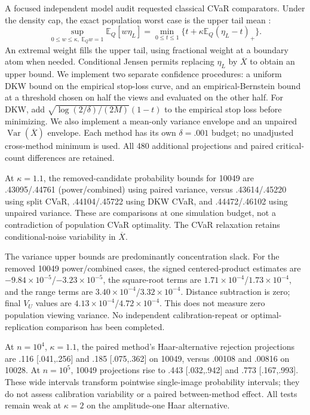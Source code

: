 A focused independent model audit requested classical CVaR comparators. Under
the density cap, the exact population worst case is the upper tail mean
\citep{rockafellar2002cvar}:
\[
 \sup_{0\le w\le\kappa,\ \mathbb E_Qw=1}\mathbb E_Q[w\eta_L]
 =\min_{0\le t\le1}\{t+\kappa\mathbb E_Q(\eta_L-t)_+\}.
\]
An extremal weight fills the upper tail, using fractional weight at a boundary
atom when needed. Conditional Jensen permits replacing $\eta_L$ by
$\overline X$ to obtain an upper bound. We implement two separate confidence
procedures: a uniform DKW bound on the empirical stop-loss curve, and an
empirical-Bernstein bound at a threshold chosen on half the views and evaluated
on the other half. For DKW, add
$\sqrt{\log(2/\delta)/(2M)}(1-t)$ to the empirical stop loss before minimizing.
We also implement a mean-only variance envelope and an unpaired
$\operatorname{Var}(\overline X)$ envelope. Each method has its own
$\delta=.001$ budget; no unadjusted cross-method minimum is used. All 480
additional projections and paired critical-count differences are retained.

At $\kappa=1.1$, the removed-candidate probability bounds for 10049 are
.43095/.44761 (power/combined) using paired variance, versus .43614/.45220
using split CVaR, .44104/.45722 using DKW CVaR, and .44472/.46102 using
unpaired variance. These are comparisons at one simulation budget, not a
contradiction of population CVaR optimality. The CVaR relaxation retains
conditional-noise variability in $\overline X$.

The variance upper bounds are predominantly concentration slack. For the
removed 10049 power/combined cases, the signed centered-product estimates are
$-9.84\times10^{-5}$/$-3.23\times10^{-5}$, the square-root terms are
$1.71\times10^{-4}$/$1.73\times10^{-4}$, and the range terms are
$3.40\times10^{-4}$/$3.32\times10^{-4}$. Distance subtraction is zero;
final $V_U$ values are $4.13\times10^{-4}$/$4.72\times10^{-4}$. This does
not measure zero population viewing variance. No independent calibration-repeat
or optimal-replication comparison has been completed.

At $n=10^4$, $\kappa=1.1$, the paired method's Haar-alternative rejection
projections are .116 [.041,.256] and .185 [.075,.362] on 10049, versus
.00108 and .00816 on 10028. At $n=10^5$, 10049 projections rise to
.443 [.032,.942] and .773 [.167,.993]. These wide intervals transform
pointwise single-image probability intervals; they do not assess calibration
variability or a paired between-method effect. All tests remain weak at
$\kappa=2$ on the amplitude-one Haar alternative.

